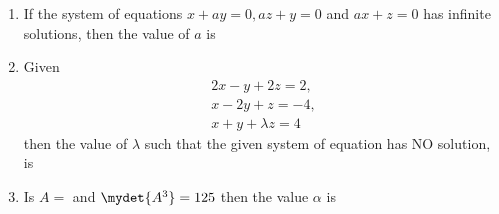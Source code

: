 \begin{enumerate}
\begin{enumerate}
    \end{enumerate}


\item If the system of equations $x + ay = 0, az + y =0$ and $ax + z =0$ has infinite solutions, then the value of $a$ is 
    \hfill{}
    \begin{enumerate}
    \end{enumerate}


\item  Given \begin{align*} 2x-y+2z=2,\\x-2y+z=-4,\\x+y+\lambda z=4 \end{align*} then the value of $\lambda$ such that the given system of equation has NO solution, is

        \hfill{}
        \begin{enumerate}
        \end{enumerate}
    \item Is $A=$  and $\mydet{A^3}=125$ then the value $\alpha$ is
        \hfill{}
        \begin{enumerate}
        \end{enumerate}



\end{enumerate}
